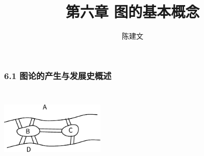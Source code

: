 \documentclass{beamer}
\begin{document}
\begin{CJK*}{UTF8}{gbsn}
\newtheorem{Ex}{习题}
\newtheorem{definition1.1.1}{定义1.1.1}
\newtheorem{definition6.2.1}{定义6.2.1}
\newtheorem{definition6.2.2}{定义6.2.2}
\newtheorem{definition6.2.3}{定义6.2.3}
\newtheorem{definition6.2.4}{定义6.2.4}
\newtheorem{definition6.2.5}{定义6.2.5}
\newtheorem{definition6.2.6}{定义6.2.6}
\newtheorem{definition6.2.7}{定义6.2.7}
\newtheorem{definition6.2.8}{定义6.2.8}
\newtheorem{definition6.2.9}{定义6.2.9}
\newtheorem{definition6.2.10}{定义6.2.10}

\newtheorem{definition6.3.1}{定义6.3.1}
\newtheorem{definition6.3.2}{定义6.3.2}
\newtheorem{definition6.3.3}{定义6.3.3}
\newtheorem{definition6.3.4}{定义6.3.4}
\newtheorem{definition6.3.5}{定义6.3.5}
\newtheorem{theorem6.3.1}{定理6.3.1}





\newtheorem{definition6.4.1}{定义6.4.1}
\newtheorem{definition6.4.2}{定义6.4.2}
\newtheorem{definition6.4.3}{定义6.4.3}
\newtheorem{definition6.4.4}{定义6.4.4}
\newtheorem{definition6.4.5}{定义6.4.5}
\newtheorem{definition6.4.6}{定义6.4.6}
\newtheorem{definition6.4.7}{定义6.4.7}

\newtheorem{definition1}{Problem Statement}
\newtheorem{theorem6.4.1}{定理6.4.1}
\newtheorem{theorem6.4.2}{定理6.4.2}
\newtheorem{theorem6.4.3}{定理6.4.3}
\newtheorem{Thm1}{Theorem1}
\newtheorem{Thm2}{Theorem2}
\newtheorem{Thm3}{Theorem3}
\newtheorem{Thm4}{Theorem4}

\newtheorem{definition6.5.1}{定义6.5.1}
\newtheorem{definition6.5.2}{定义6.5.2}

\newtheorem{theorem6.5.1}{定理6.5.1}
\newtheorem{theorem6.5.2}{定理6.5.2}
\newtheorem{theorem6.5.3}{定理6.5.3}

\newtheorem{definition6.6.1}{定义6.6.1}
\newtheorem{theorem6.6.1}{定理6.6.1}
\newtheorem{theorem6.6.2}{定理6.6.2}
\newtheorem{theorem6.6.3}{定理6.6.3}
\newtheorem{theorem6.6.4}{引理6.6.1}



\newtheorem{theorem6.2.1}{定理6.2.1}
\newtheorem{theorem6.2.2}{推论6.2.1}
\newtheorem{example1}{例:}

\date{}
\author{陈建文}

\title{第六章 图的基本概念}
\begin{frame}
  \titlepage
\end{frame}  
\begin{frame}
  \frametitle{6.1 图论的产生与发展史概述}
  \centering
\includegraphics[width=5cm,height=4cm]{konigsberg} 
\end{frame}



\end{CJK*}
\end{document}
